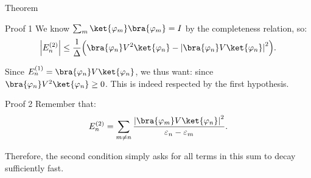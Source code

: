 \documentclass[a4paper]{article}
\begin{document}
\begin{parag}{Theorem}
\begin{subparag}{Proof 1}
        We know $\sum_{m} \ket{\phi_m}\bra{\phi_m} = I$ by the completeness relation, so: 
        \[\left|E_n^{\left(2\right)}\right| \leq \frac{1}{\Delta}\left(\bra{\phi_n} V^2 \ket{\phi_n} -  \left|\bra{\phi_n} V \ket{\phi_n}\right|^2\right).\]

        Since $E_n^{\left(1\right)} = \bra{\phi_n} V \ket{\phi_n}$, we thus want: 
        since $\bra{\phi_n} V^2 \ket{\phi_n} \geq 0$. This is indeed respected by the first hypothesis.
    \end{subparag}

    \begin{subparag}{Proof 2}
        Remember that:
        \[E_n^{\left(2\right)} = \sum_{m \neq n} \frac{\left|\bra{\phi_m} V \ket{\phi_n}\right|^2}{\epsilon_n - \epsilon_m}.\]
        
        Therefore, the second condition simply asks for all terms in this sum to decay sufficiently fast.
    \end{subparag}
\end{parag}
\end{document}
